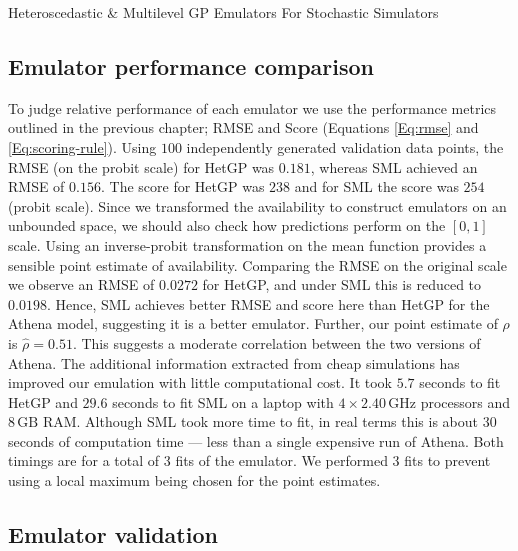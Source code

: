 \begin{chapter}{Heteroscedastic \& Multilevel GP Emulators For Stochastic Simulators\label{Ch:Hetsml}}
\subsection{Emulator performance comparison}

To judge relative performance of each emulator we use the performance metrics outlined in the previous chapter; RMSE and Score (Equations \ref{Eq:rmse} and \ref{Eq:scoring-rule}). Using $100$ independently generated validation data points, the RMSE (on the probit scale) for HetGP was $0.181$, whereas SML achieved an RMSE of $0.156$. The score for HetGP was $238$ and for SML the score was $254$ (probit scale). Since we transformed the availability to construct emulators on an unbounded space, we should also check how predictions perform on the $[0,1]$ scale. Using an inverse-probit transformation on the mean function provides a sensible point estimate of availability. Comparing the RMSE on the original scale we observe an RMSE of $0.0272$ for HetGP, and under SML this is reduced to $0.0198$. Hence, SML achieves better RMSE and score here than HetGP for the Athena model, suggesting it is a better emulator. Further, our point estimate of $\rho$ is $\hat{\rho} = 0.51$. This suggests a moderate correlation between the two versions of Athena. The additional information extracted from cheap simulations has improved our emulation with little computational cost. It took $5.7$ seconds to fit HetGP and $29.6$ seconds to fit SML on a laptop with $4 \times 2.40\,\text{GHz}$ processors and $8\,\text{GB}$ RAM. Although SML took more time to fit, in real terms this is about $30$ seconds of computation time --- less than a single expensive run of Athena. Both timings are for a total of $3$ fits of the emulator. We performed $3$ fits to prevent using a local maximum being chosen for the point estimates.

\subsection{Emulator validation}


\end{chapter}
